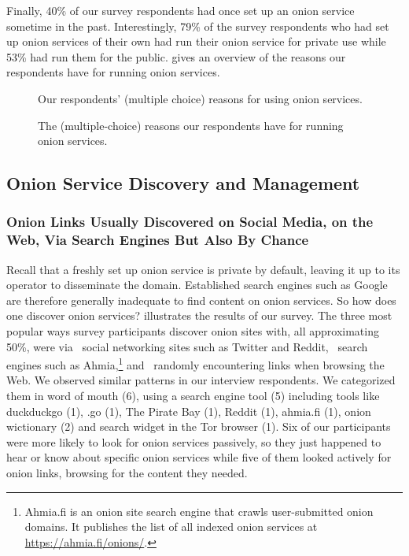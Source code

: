Finally, 40\% of our survey respondents had once set up an onion service
sometime in the past.  Interestingly, 79\% of the survey respondents who had set
up onion services of their own had run their onion service for private use while
53\% had run them for the public.  gives an
overview of the reasons our respondents have for running onion services.

\begin{figure}[t]
    \centering
    
    \caption{Our respondents' (multiple choice) reasons for using onion
    services.}
    \label{fig:onion-usage}
\end{figure}

\begin{figure}[t]
    \centering
    
    \caption{The (multiple-choice) reasons our respondents have for running
    onion services.}
    \label{fig:onion-operation-reasons}
\end{figure}

\subsection{Onion Service Discovery and Management}
\label{sec:manage}

\subsubsection{Onion Links Usually Discovered on Social Media, on the Web, Via Search Engines But Also By Chance}

Recall that a freshly set up onion service is private by default, leaving it up
to its operator to disseminate the domain.  Established search engines such as
Google are therefore generally inadequate to find content on onion services.  So
how does one discover onion services?   illustrates
the results of our survey.  The three most popular ways survey participants
discover onion sites with, all approximating 50\%, were via \first~social
networking sites such as Twitter and Reddit, \second~search engines such as
Ahmia,\footnote{Ahmia.fi is an onion site search engine that crawls
user-submitted onion domains.  It publishes the list of all indexed onion
services at \url{https://ahmia.fi/onions/}.} and \third~randomly encountering
links when browsing the Web.  We observed similar patterns in our interview
respondents.  We categorized them in word of mouth (6), using a search engine
tool (5) including tools like duckduckgo (1), .go (1), The Pirate Bay (1),
Reddit (1), ahmia.fi (1), onion wictionary (2) and search widget in the Tor
browser (1).  Six of our participants were more likely to look for onion
services passively, so they just happened to hear or know about specific onion
services while five of them looked actively for onion links, browsing for the
content they needed.

